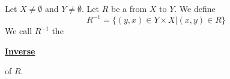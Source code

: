 \newcommand{\RelationInverse}[0]{
    \textbf{\hyperref[def:RelationInverse]{Inverse}}
}\begin{df}
\label{def:RelationInverse}

\rm
    Let $X\neq \emptyset$ and
    $Y \neq \emptyset$. 
    Let $R$ be a 
    \Relation
    from $X$ to $Y$. 
    We define 
    \begin{equation*}
    R^{-1} = \{(y,x) \in Y\times X | (x,y) \in R\}
    \end{equation*}
    We call $R^{-1}$ the 
    \RelationInverse
    of $R$. 
\end{df}
